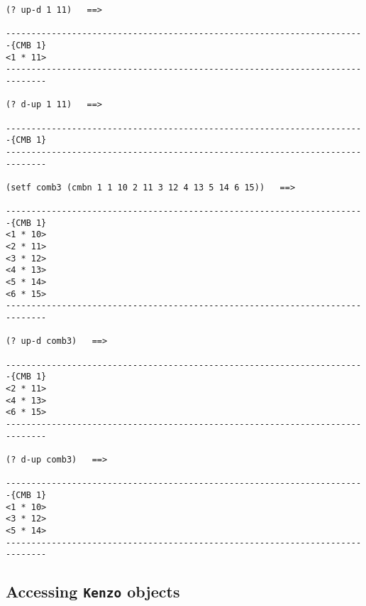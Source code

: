 {\footnotesize\begin{verbatim}
(? up-d 1 11)   ==>

-----------------------------------------------------------------------{CMB 1}
<1 * 11>
------------------------------------------------------------------------------

(? d-up 1 11)   ==>

-----------------------------------------------------------------------{CMB 1}
------------------------------------------------------------------------------

(setf comb3 (cmbn 1 1 10 2 11 3 12 4 13 5 14 6 15))   ==>

-----------------------------------------------------------------------{CMB 1}
<1 * 10>
<2 * 11>
<3 * 12>
<4 * 13>
<5 * 14>
<6 * 15>
------------------------------------------------------------------------------

(? up-d comb3)   ==>

-----------------------------------------------------------------------{CMB 1}
<2 * 11>
<4 * 13>
<6 * 15>
------------------------------------------------------------------------------

(? d-up comb3)   ==>

-----------------------------------------------------------------------{CMB 1}
<1 * 10>
<3 * 12>
<5 * 14>
------------------------------------------------------------------------------
\end{verbatim}}

\newpage

\subsection {Accessing {\tt Kenzo} objects}

